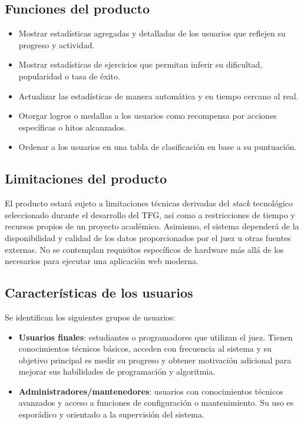 \subsection{Funciones del producto}

\begin{itemize}
    \item Mostrar estadísticas agregadas y detalladas de los usuarios que reflejen su progreso y actividad.
    \item Mostrar estadísticas de ejercicios que permitan inferir su dificultad, popularidad o tasa de éxito.
    \item Actualizar las estadísticas de manera automática y en tiempo cercano al real.
    \item Otorgar logros o medallas a los usuarios como recompensa por acciones específicas o hitos alcanzados.
    \item Ordenar a los usuarios en una tabla de clasificación en base a su puntuación.
\end{itemize}

\subsection{Limitaciones del producto}

El producto estará sujeto a limitaciones técnicas derivadas del \textit{stack} tecnológico seleccionado durante el desarrollo del TFG, así como a restricciones de tiempo y recursos propios de un proyecto académico. Asimismo, el sistema dependerá de la disponibilidad y calidad de los datos proporcionados por el juez \aer u otras fuentes externas. No se contemplan requisitos específicos de hardware más allá de los necesarios para ejecutar una aplicación web moderna.

\subsection{Características de los usuarios}

Se identifican los siguientes grupos de usuarios:

\begin{itemize}
    \item \textbf{Usuarios finales}: estudiantes o programadores que utilizan el juez. Tienen conocimientos técnicos básicos, acceden con frecuencia al sistema y su objetivo principal es medir su progreso y obtener motivación adicional para mejorar sus habilidades de programación y algoritmia.
    \item \textbf{Administradores/mantenedores}: usuarios con conocimientos técnicos avanzados y acceso a funciones de configuración o mantenimiento. Su uso es esporádico y orientado a la supervisión del sistema.
\end{itemize}

